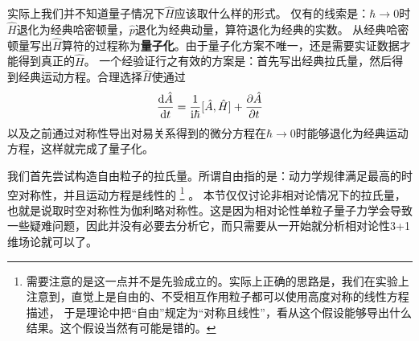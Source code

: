 \documentclass[hyperref, UTF8, a4paper]{ctexart}
\newcommand*{\ii}{\mathrm{i}}
\begin{document}
实际上我们并不知道量子情况下$\hat{H}$应该取什么样的形式。
仅有的线索是：$\hbar \to 0$时$\hat{H}$退化为经典哈密顿量，$\hat{p}$退化为经典动量，算符退化为经典的实数。
从经典哈密顿量写出$\hat{H}$算符的过程称为\textbf{量子化}。由于量子化方案不唯一，还是需要实证数据才能得到真正的$\hat{H}$。
一个经验证行之有效的方案是：首先写出经典拉氏量，然后得到经典运动方程。合理选择$\hat{H}$使通过
\begin{equation}
    \dv{\hat{A}}{t} = \frac{1}{\ii \hbar} [\hat{A}, \hat{H}] + \pdv{\hat{A}}{t}
\end{equation}
以及之前通过对称性导出对易关系得到的微分方程在$\hbar \to 0$时能够退化为经典运动方程，这样就完成了量子化。

我们首先尝试构造自由粒子的拉氏量。所谓自由指的是：动力学规律满足最高的时空对称性，并且运动方程是线性的%
\footnote{
    需要注意的是这一点并不是先验成立的。实际上正确的思路是，我们在实验上注意到，直觉上是自由的、不受相互作用粒子都可以使用高度对称的线性方程描述，
    于是理论中把“自由”规定为“对称且线性”，看从这个假设能够导出什么结果。这个假设当然有可能是错的。
}%
。
本节仅仅讨论非相对论情况下的拉氏量，也就是说取时空对称性为伽利略对称性。这是因为相对论性单粒子量子力学会导致一些疑难问题，因此并没有必要去分析它，而只需要从一开始就分析相对论性3+1维场论就可以了。
\end{document}
